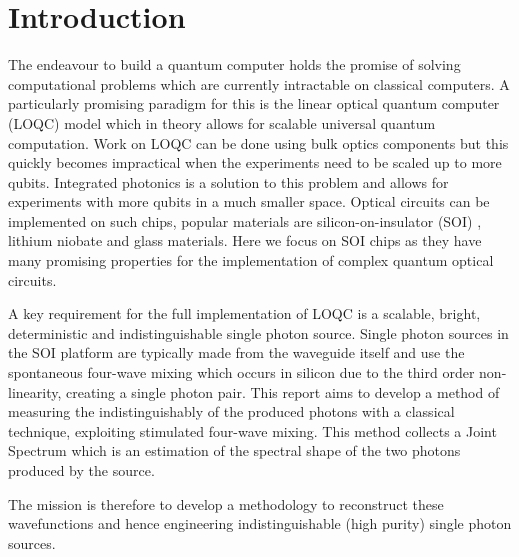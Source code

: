\newpage
\section{Introduction}
The endeavour to build a quantum computer holds the promise of solving computational problems which are currently intractable on classical computers. A particularly promising paradigm for this is the linear optical quantum computer (LOQC) model which in theory allows for scalable universal quantum computation. Work on LOQC can be done using bulk optics components but this quickly becomes impractical when the experiments need to be scaled up to more qubits. Integrated photonics is a solution to this problem and allows for experiments with more qubits in a much smaller space. Optical circuits can be implemented on such chips, popular materials are silicon-on-insulator (SOI) , lithium niobate and glass materials. Here we focus on SOI chips as they have many promising properties for the implementation of complex quantum optical circuits.

A key requirement for the full implementation of LOQC is a scalable, bright, deterministic and indistinguishable single photon source. Single photon sources in the SOI platform are typically made from the waveguide itself and use the spontaneous four-wave mixing which occurs in silicon due to the third order non-linearity, creating a single photon pair. This report aims to develop a method of measuring the indistinguishably of the produced photons with a classical technique, exploiting stimulated four-wave mixing. This method collects a Joint Spectrum which is an estimation of the spectral shape of the two photons produced by the source.

The mission is therefore to develop a methodology to reconstruct these wavefunctions and hence engineering indistinguishable (high purity) single photon sources.

